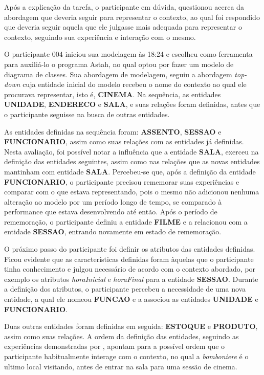 Após a explicação da tarefa, o participante em dúvida, questionou acerca da abordagem que deveria seguir para representar o contexto, ao qual foi respondido que deveria seguir aquela que ele julgasse mais adequada para representar o contexto, seguindo sua experiência e interação com o mesmo. 

O participante 004 iniciou sua modelagem às 18:24 e escolheu como ferramenta para auxiliá-lo o programa Astah, no qual optou por fazer um modelo de diagrama de classes. Sua abordagem de modelagem, seguiu a abordagem \textit{top-down} cuja entidade inicial do modelo recebeu o nome do contexto ao qual ele procurava representar, isto é, \textbf{CINEMA}. Na sequência, as entidades \textbf{UNIDADE}, \textbf{ENDERECO} e \textbf{SALA}, e suas relações foram definidas, antes que o participante seguisse na busca de outras entidades.

As entidades definidas na sequência foram: \textbf{ASSENTO}, \textbf{SESSAO} e \textbf{FUNCIONARIO}, assim como suas relações com as entidades já definidas. Nesta avaliação, foi possível notar a influência que a entidade \textbf{SALA}, exerceu na definição das entidades seguintes, assim como nas relações que as novas entidades mantinham com entidade \textbf{SALA}. Percebeu-se que, após a definição da entidade \textbf{FUNCIONARIO}, o participante precisou rememorar suas experiências e comparar com o que estava representando, pois o mesmo não adicionou nenhuma alteração ao modelo por um período longo de tempo, se comparado à performance que estava desenvolvendo até então. Após o período de rememoração, o participante definiu a entidade \textbf{FILME} e a relacionou com a entidade \textbf{SESSAO}, entrando novamente em estado de rememoração.

O próximo passo do participante foi definir os atributos das entidades definidas. Ficou evidente que as características definidas foram àquelas que o participante tinha conhecimento e julgou necessário de acordo com o contexto abordado, por exemplo os atributos \textit{horaInicial} e \textit{horaFinal} para a entidade \textbf{SESSAO}. Durante a definição dos atributos, o participante percebeu a necessidade de uma nova entidade, a qual ele nomeou \textbf{FUNCAO} e a associou as entidades \textbf{UNIDADE} e \textbf{FUNCIONARIO}. 

Duas outras entidades foram definidas em seguida: \textbf{ESTOQUE} e \textbf{PRODUTO}, assim como suas relações. A ordem da definição das entidades, seguindo as experiências demonstradas por , apontam para a possível ordem que o participante habitualmente interage com o contexto, no qual a \textit{bomboniere} é o ultimo local visitando, antes de entrar na sala para uma sessão de cinema.

